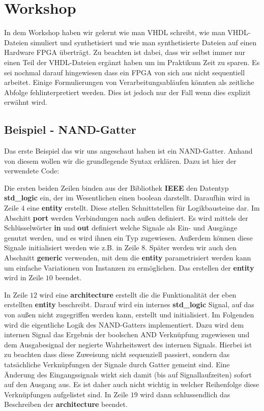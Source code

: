 \section{Workshop}
In dem Workshop haben wir gelernt wie man VHDL schreibt, wie man VHDL-Dateien simuliert und synthetisiert und wie man synthetisierte Dateien auf einen Hardware FPGA überträgt.
Zu beachten ist dabei, dass wir selbst immer nur einen Teil der VHDL-Dateien ergänzt haben um im Praktikum Zeit zu sparen.
Es sei nochmal darauf hingewiesen dass ein FPGA von sich aus nicht sequentiell arbeitet.
Einige Formulierungen von Verarbeitungsabläufen könnten als zeitliche Abfolge fehlinterpretiert werden.
Dies ist jedoch nur der Fall wenn dies explizit erwähnt wird.

\subsection{Beispiel - NAND-Gatter}
Das erste Beispiel das wir uns angeschaut haben ist ein NAND-Gatter.
Anhand von diesem wollen wir die grundlegende Syntax erklären.
Dazu ist hier der verwendete Code:



Die ersten beiden Zeilen binden aus der Bibliothek \textbf{IEEE} den Datentyp \textbf{std\_logic} ein, der im Wesentlichen einen boolean darstellt.
Daraufhin wird in Zeile $4$ eine \textbf{entity} erstellt.
Diese stellen Schnittstellen für Logikbausteine dar.
Im Abschitt \textbf{port} werden Verbindungen nach außen definiert.
Es wird mittels der Schlüsselwörter \textbf{in} und \textbf{out} definiert welche Signale als Ein- und Ausgänge genutzt werden, und es wird ihnen ein Typ zugewiesen.
Außerdem können diese Signale initialisiert werden wie z.B. in Zeile $8$.
Später werden wir auch den Abschnitt \textbf{generic} verwenden, mit dem die \textbf{entity} parametrisiert werden kann um einfache Variationen von Instanzen zu ermöglichen.
Das erstellen der \textbf{entity} wird in Zeile $10$ beendet.

In Zeile $12$ wird eine \textbf{architecture} erstellt die die Funktionalität der eben erstellten \textbf{entity} beschreibt.
Darauf wird ein internes \textbf{std\_logic} Signal, auf das von außen nicht zugegriffen werden kann, erstellt und initialisiert.
Im Folgenden wird die eigentliche Logik des NAND-Gatters implementiert.
Dazu wird dem internen Signal das Ergebnis der boolschen AND Verknüpfung zugewiesen und dem Ausgabesignal der negierte Wahrheitswert des internen Signals.
Hierbei ist zu beachten dass diese Zuweisung nicht sequenziell passiert, sondern das tatsächliche Verknüpfungen der Signale durch Gatter gemeint sind.
Eine Änderung des Eingangssignals wirkt sich damit (bis auf Signallaufzeiten) sofort auf den Ausgang aus.
Es ist daher auch nicht wichtig in welcher Reihenfolge diese Verknüpfungen aufgelistet sind.
In Zeile $19$ wird dann schlussendlich das Beschreiben der \textbf{architecture} beendet.

